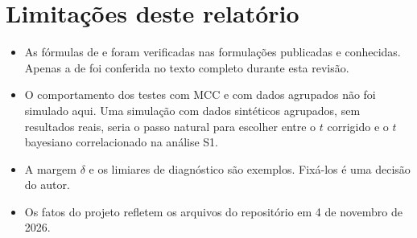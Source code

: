 \documentclass[11pt,a4paper]{article}
\begin{document}
\section{Limitações deste relatório}

\begin{itemize}[leftmargin=1.4em]
\item As fórmulas de \citet{dietterich1998} e \citet{alpaydin1999} foram verificadas nas formulações publicadas e conhecidas. Apenas a de \citet{bouckaert2004} foi conferida no texto completo durante esta revisão.
\item O comportamento dos testes com MCC e com dados agrupados não foi simulado aqui. Uma simulação com dados sintéticos agrupados, sem resultados reais, seria o passo natural para escolher entre o $t$ corrigido e o $t$ bayesiano correlacionado na análise S1.
\item A margem $\delta$ e os limiares de diagnóstico são exemplos. Fixá-los é uma decisão do autor.
\item Os fatos do projeto refletem os arquivos do repositório em 4 de novembro de 2026.
\end{itemize}



\end{document}
